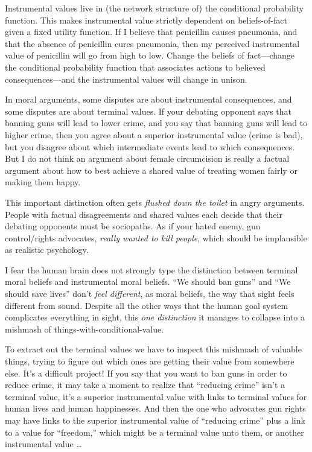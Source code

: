 {
 Instrumental values live in (the network structure of) the
conditional probability function. This makes instrumental value
strictly dependent on beliefs-of-fact given a fixed utility function.
If I believe that penicillin causes pneumonia, and that the absence of
penicillin cures pneumonia, then my perceived instrumental value of
penicillin will go from high to low. Change the beliefs of
fact---change the conditional probability function that associates
actions to believed consequences---and the instrumental values will
change in unison.}

{
 In moral arguments, some disputes are about instrumental
consequences, and some disputes are about terminal values. If your
debating opponent says that banning guns will lead to lower crime, and
you say that banning guns will lead to higher crime, then you agree
about a superior instrumental value (crime is bad), but you disagree
about which intermediate events lead to which consequences. But I do
not think an argument about female circumcision is really a factual
argument about how to best achieve a shared value of treating women
fairly or making them happy.}

{
 This important distinction often gets \textit{flushed down the
toilet} in angry arguments. People with factual disagreements and
shared values each decide that their debating opponents must be
sociopaths. As if your hated enemy, gun control/rights advocates,
\textit{really wanted to kill people}, which should be implausible as
realistic psychology.}

{
 I fear the human brain does not strongly type the distinction
between terminal moral beliefs and instrumental moral beliefs.
``We should ban guns'' and
``We should save lives''
don't \textit{feel different}, as moral beliefs, the
way that sight feels different from sound. Despite all the other ways
that the human goal system complicates everything in sight, this
\textit{one distinction} it manages to collapse into a mishmash of
things-with-conditional-value.}

{
 To extract out the terminal values we have to inspect this
mishmash of valuable things, trying to figure out which ones are
getting their value from somewhere else. It's a
difficult project! If you say that you want to ban guns in order to
reduce crime, it may take a moment to realize that
``reducing crime''
isn't a terminal value, it's a superior
instrumental value with links to terminal values for human lives and
human happinesses. And then the one who advocates gun rights may have
links to the superior instrumental value of ``reducing
crime'' plus a link to a value for
``freedom,'' which might be a
terminal value unto them, or another instrumental value \ldots}

